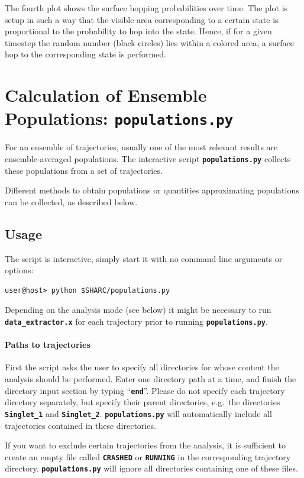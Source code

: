 \documentclass[a4paper,11pt,DIV=15,openany,twoside=false]{scrbook}
\newcommand{\ttt}[1]{\textbf{\texttt{#1}}}
\begin{document}
The fourth plot shows the surface hopping probabilities over time. The plot is setup in such a way that the visible area corresponding to a certain state is proportional to the probability to hop into the state. Hence, if for a given timestep the random number (black circles) lies within a colored area, a surface hop to the corresponding state is performed.

\section{Calculation of Ensemble Populations: \ttt{populations.py}}\label{sec:populations.py}

For an ensemble of trajectories, usually one of the most relevant results are ensemble-averaged populations. The interactive script \ttt{populations.py} collects these populations from a set of trajectories. 

Different methods to obtain populations or quantities approximating populations can be collected, as described below.

\subsection{Usage}

The script is interactive, simply start it with no command-line arguments or options:
\begin{verbatim}
user@host> python $SHARC/populations.py
\end{verbatim}

Depending on the analysis mode (see below) it might be necessary to run \ttt{data\_extractor.x} for each trajectory prior to running \ttt{populations.py}. 

\paragraph{Paths to trajectories}

First the script asks the user to specify all directories for whose content the analysis should be performed. Enter one directory path at a time, and finish the directory input section by typing ``\ttt{end}''. Please do not specify each trajectory directory separately, but specify their parent directories, e.g.\ the directories \ttt{Singlet\_1} and \ttt{Singlet\_2}. \ttt{populations.py} will automatically include all trajectories contained in these directories.

If you want to exclude certain trajectories from the analysis, it is sufficient to create an empty file called \ttt{CRASHED} or \ttt{RUNNING} in the corresponding trajectory directory. \ttt{populations.py} will ignore all directories containing one of these files.
\end{document}
